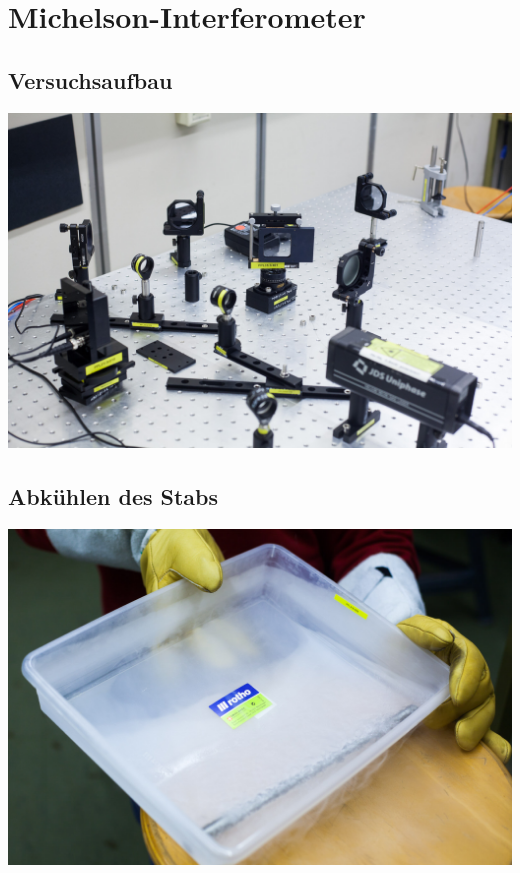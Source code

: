 \section{Michelson-Interferometer}
\subsection*{Versuchsaufbau}
\begin{frame}
	\includegraphics[width=\textwidth]{images/2/interferrometer-4}
\end{frame}
\subsection*{Abkühlen des Stabs}
\begin{frame}
	\includegraphics[width=\textwidth]{images/2/interferrometer-1}
\end{frame}
